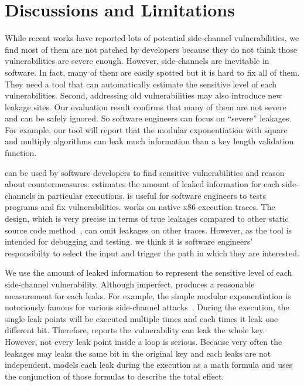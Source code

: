 \section{Discussions and Limitations}
While recent works have reported lots
of potential side-channel vulnerabilities, we find most of them are not patched by
developers because they do not think those vulnerabilities are severe enough.
However, side-channels are inevitable in software. In fact, many of them
are easily spotted but it is hard to fix all of them. They need a
tool that can automatically estimate the sensitive level of each vulnerabilities.
Second, addressing old vulnerabilities may also introduce new leakage
sites. Our evaluation result confirms that many of them are not 
severe and can be safely ignored. So software engineers can focus on
``severe'' leakages. For example, our tool will report that 
the modular exponentiation with square and multiply algorithms can
leak much information than a key length validation function.

\tool{} can be used by software developers to find sensitive vulnerabilities
and reason about countermeasures.
\tool{} estimates the amount of leaked information for each side-channels
in particular executions. \tool{} is useful for software
engineers to tests programs and fix vulnerabilities.
\tool{} works on native x86 execution traces. The design, which is very
precise in terms of true leakages compared to other static source code
method~\cite{197207,BacelarAlmeida:2013:FVS:2483313.2483334}, can omit
leakages on other traces. However, as the tool is intended for debugging and testing.
we think it is software engineers' responsibilty to select the input and trigger the 
path in which they are interested.

We use the amount of leaked information to represent the sensitive level of each
side-channel vulnerability. Although imperfect, \tool{} produces a reasonable
measurement for each leaks. For example, the simple modular exponentiation is notoriously
famous for various side-channel attacks~\cite{kocher1996timing}. During the execution, the single 
leak points will be executed multiple times and each times it leak one different bit.
Therefore, \tool{} reports the vulnerability can leak the whole key. However, not every
leak point inside a loop is serious. Because very often the leakages may leaks the same
bit in the original key and each leaks are not independent. \tool{} models each leak during the execution 
as a math formula and uses the conjunction of those formulas to describe the total effect.

